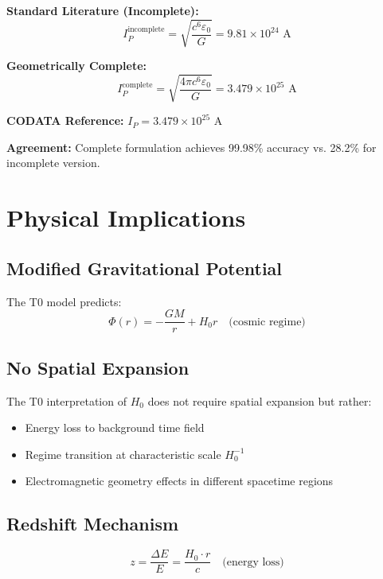 \documentclass[12pt,a4paper]{article}
\begin{document}
	\textbf{Standard Literature (Incomplete):}
	\begin{equation}
		I_P^{\text{incomplete}} = \sqrt{\frac{c^6\varepsilon_0}{G}} = 9.81 \times 10^{24} \text{ A}
	\end{equation}
	
	\textbf{Geometrically Complete:}
	\begin{equation}
		I_P^{\text{complete}} = \sqrt{\frac{4\pi c^6\varepsilon_0}{G}} = 3.479 \times 10^{25} \text{ A}
	\end{equation}
	
	\textbf{CODATA Reference:} $I_P = 3.479 \times 10^{25}$ A
	
	\textbf{Agreement:} Complete formulation achieves 99.98\% accuracy vs. 28.2\% for incomplete version.
	
	\section{Physical Implications}
	
	\subsection{Modified Gravitational Potential}
	The T0 model predicts:
	\begin{equation}
		\Phi(r) = -\frac{GM}{r} + H_0 r \quad \text{(cosmic regime)}
	\end{equation}
	
	\subsection{No Spatial Expansion}
	The T0 interpretation of $H_0$ does not require spatial expansion but rather:
	\begin{itemize}
		\item Energy loss to background time field
		\item Regime transition at characteristic scale $H_0^{-1}$
		\item Electromagnetic geometry effects in different spacetime regions
	\end{itemize}
	
	\subsection{Redshift Mechanism}
	\begin{equation}
		z = \frac{\Delta E}{E} = \frac{H_0 \cdot r}{c} \quad \text{(energy loss)}
	\end{equation}
	
\end{document}
